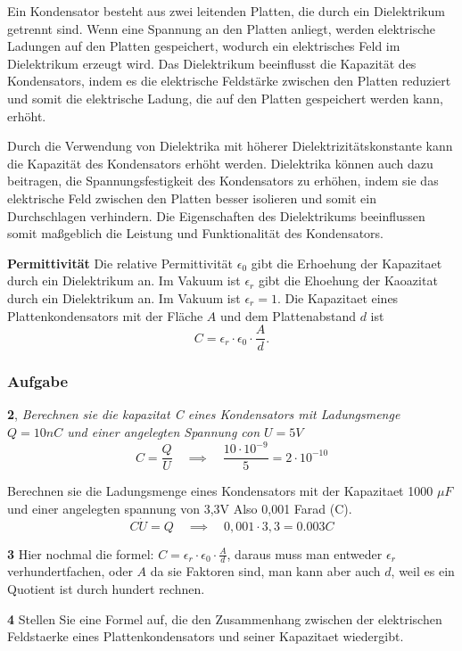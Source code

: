 \documentclass{report}
\begin{document}
Ein Kondensator besteht aus zwei leitenden Platten, die durch ein Dielektrikum
getrennt sind. Wenn eine Spannung an den Platten anliegt, werden elektrische
Ladungen auf den Platten gespeichert, wodurch ein elektrisches Feld im
Dielektrikum erzeugt wird. Das Dielektrikum beeinflusst die Kapazität des
Kondensators, indem es die elektrische Feldstärke zwischen den Platten
reduziert und somit die elektrische Ladung, die auf den Platten gespeichert
werden kann, erhöht.

Durch die Verwendung von Dielektrika mit höherer Dielektrizitätskonstante kann
die Kapazität des Kondensators erhöht werden. Dielektrika können auch dazu
beitragen, die Spannungsfestigkeit des Kondensators zu erhöhen, indem sie das
elektrische Feld zwischen den Platten besser isolieren und somit ein
Durchschlagen verhindern. Die Eigenschaften des Dielektrikums beeinflussen
somit maßgeblich die Leistung und Funktionalität des Kondensators.


\textbf{Permittivit\"at}
Die relative Permittivit\"at $\epsilon_0$ gibt die Erhoehung der Kapazitaet
durch ein Dielektrikum an. Im Vakuum ist $\epsilon_r$ gibt die Ehoehung der
Kaoazitat durch ein Dielektrikum an. Im Vakuum ist $\epsilon_r = 1$. Die
Kapazitaet eines Plattenkondensators mit der Fl\"ache $A$ und dem
Plattenabstand $d$ ist
\[C=\epsilon_r \cdot \epsilon_0 \cdot \frac{A}{d}.\]

\subsubsection{Aufgabe}
\textbf{2}, \textit{Berechnen sie die kapazitat C eines Kondensators mit Ladungsmenge
$Q=10nC$ und einer angelegten Spannung con $U=5V$}
\[ C=\frac{Q}{U} \quad \implies \quad \frac{10 \cdot 10^{-9}}{5}= 2\cdot 10^{-10} \]

Berechnen sie die Ladungsmenge eines Kondensators mit der Kapazitaet 1000 $\mu
F$ und einer angelegten spannung von 3,3V Also 0,001 Farad (C).
\[
  C \dot U = Q \quad \implies \quad 0,001\cdot 3,3= 0.003 C
\]

\textbf{3}
Hier nochmal die formel: $C=\epsilon_r \cdot \epsilon_0 \cdot \frac{A}{d}$,
daraus muss man entweder $\epsilon_r$ verhundertfachen, oder $A$ da sie
Faktoren sind, man kann aber auch $d$, weil es ein Quotient ist durch hundert
rechnen.

\textbf{4}
Stellen Sie eine Formel auf, die den Zusammenhang zwischen der elektrischen
Feldstaerke eines Plattenkondensators und seiner Kapazitaet wiedergibt.
\end{document}
